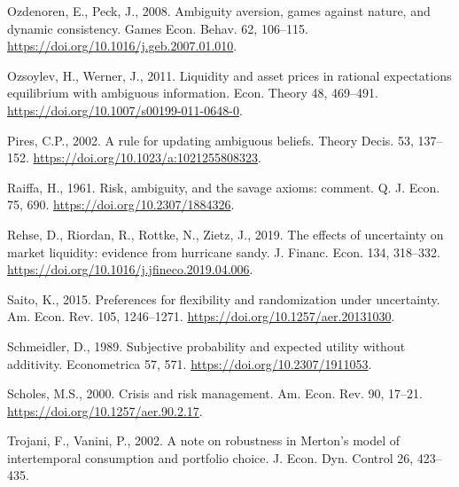 \documentclass[12pt,a4paper]{article}
\newenvironment{biblock}{%
  \par\vspace{2pt}\noindent\small%
  \ignorespaces
}{%
  \par\vspace{2pt}%
}
\begin{document}
\begin{biblock}
Ozdenoren, E., Peck, J., 2008. Ambiguity aversion, games against nature, and dynamic consistency. Games Econ. Behav. 62, 106--115. \url{https://doi.org/10.1016/j.geb.2007.01.010}.
\end{biblock}

\begin{biblock}
Ozsoylev, H., Werner, J., 2011. Liquidity and asset prices in rational expectations equilibrium with ambiguous information. Econ. Theory 48, 469--491. \url{https://doi.org/10.1007/s00199-011-0648-0}.
\end{biblock}

\begin{biblock}
Pires, C.P., 2002. A rule for updating ambiguous beliefs. Theory Decis. 53, 137--152. \url{https://doi.org/10.1023/a:1021255808323}.
\end{biblock}

\begin{biblock}
Raiffa, H., 1961. Risk, ambiguity, and the savage axioms: comment. Q. J. Econ. 75, 690. \url{https://doi.org/10.2307/1884326}.
\end{biblock}

\begin{biblock}
Rehse, D., Riordan, R., Rottke, N., Zietz, J., 2019. The effects of uncertainty on market liquidity: evidence from hurricane sandy. J. Financ. Econ. 134, 318--332. \url{https://doi.org/10.1016/j.jfineco.2019.04.006}.
\end{biblock}

\begin{biblock}
Saito, K., 2015. Preferences for flexibility and randomization under uncertainty. Am. Econ. Rev. 105, 1246--1271. \url{https://doi.org/10.1257/aer.20131030}.
\end{biblock}

\begin{biblock}
Schmeidler, D., 1989. Subjective probability and expected utility without additivity. Econometrica 57, 571. \url{https://doi.org/10.2307/1911053}.
\end{biblock}

\begin{biblock}
Scholes, M.S., 2000. Crisis and risk management. Am. Econ. Rev. 90, 17--21. \url{https://doi.org/10.1257/aer.90.2.17}.
\end{biblock}

\begin{biblock}
Trojani, F., Vanini, P., 2002. A note on robustness in Merton's model of intertemporal consumption and portfolio choice. J. Econ. Dyn. Control 26, 423--435.
\end{biblock}
\end{document}
